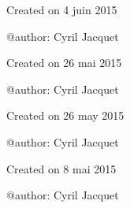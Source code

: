 \begin{DoxyVerb}Created on 4 juin 2015

@author:  Cyril Jacquet
\end{DoxyVerb}


\begin{DoxyVerb}Created on 26 mai 2015

@author:  Cyril Jacquet
\end{DoxyVerb}


\begin{DoxyVerb}Created on 26 may 2015

@author:  Cyril Jacquet
\end{DoxyVerb}


\begin{DoxyVerb}Created on 8 mai 2015

@author:  Cyril Jacquet
\end{DoxyVerb}
 